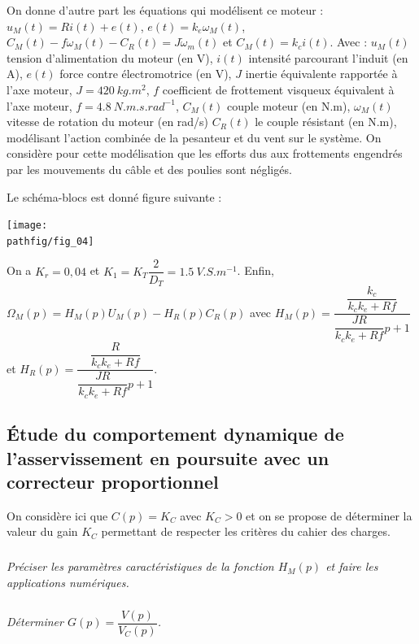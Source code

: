\documentclass[10pt,fleqn]{article} %
\begin{document}


On donne d’autre part les équations qui modélisent ce moteur : $u_M(t)=R i(t) + e(t)$, 
$e(t) = k_e \omega_M(t)$, 
$C_M (t)-f\omega_M (t)-C_R (t)=J\dot{\omega}_m(t)$ et 
$C_M (t) = k_ c i(t)$. Avec : 
$u_M (t)$ tension d’alimentation du moteur (en V),  $i(t)$ intensité parcourant l’induit (en A), $e(t)$ force contre électromotrice (en V), $J$ inertie équivalente rapportée à l’axe moteur, $J = \SI{420}{kg.m^2}$, $f$ coefficient de frottement visqueux équivalent à l’axe moteur, $f = \SI{4,8}{N.m.s.rad^{-1}}$, $C_M (t)$ couple moteur (en N.m),  $\omega_M(t)$ vitesse de rotation du moteur (en rad/s)  $C_R (t)$ le couple résistant (en N.m), modélisant l’action combinée de la pesanteur et du vent sur le système. On considère pour cette modélisation que les efforts dus aux frottements engendrés par les mouvements du câble et des poulies sont négligés.

Le schéma-blocs est donné figure suivante : 

\begin{center}
\texttt{[image: \\pathfig/fig\_04]}
\end{center}

On a $K_r = 0,04$ et $K_1=K_T\dfrac{2}{D_T}=\SI{1,5}{V.S.m^{-1}}$.
Enfin, $\Omega_M(p)=H_M(p)U_M(p)-H_R(p)C_R(p)$ avec $H_M(p)=\dfrac{\dfrac{k_c}{k_ck_e+Rf}}{\dfrac{JR}{k_ck_e+Rf}p+1}$ et $H_R(p)=\dfrac{\dfrac{R}{k_ck_e+Rf}}{\dfrac{JR}{k_ck_e+Rf}p+1}$.

\subsection*{Étude du comportement dynamique de l’asservissement en poursuite avec un correcteur proportionnel }
On considère ici que $C(p) = K_C$ avec $K_C > $0 et on se propose de déterminer la valeur du gain $K_C$ permettant de respecter les critères du cahier des charges. 

\subparagraph{}\textit{Préciser les paramètres caractéristiques de la fonction $H_M (p)$ et faire les applications numériques.}
\subparagraph{}\textit{Déterminer $G(p)=\dfrac{V(p)}{V_C(p)}$.}
\end{document}
